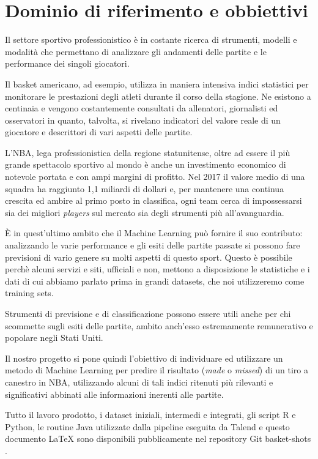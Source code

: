 \section{Dominio di riferimento e obbiettivi}
Il settore sportivo professionistico è in costante ricerca di strumenti, modelli e modalità che permettano di analizzare gli andamenti delle partite e le performance dei singoli giocatori.

Il basket americano, ad esempio, utilizza in maniera intensiva indici statistici per monitorare le prestazioni degli atleti durante il corso della stagione. Ne esistono a centinaia e vengono costantemente consultati da allenatori, giornalisti ed osservatori in quanto, talvolta, si rivelano indicatori del valore reale di un giocatore e descrittori di vari aspetti delle partite.
\par
L'NBA, lega professionistica della regione statunitense, oltre ad essere il più grande spettacolo sportivo al mondo è anche un investimento economico di notevole portata e con ampi margini di profitto. Nel 2017 il valore medio di una squadra ha raggiunto 1,1 miliardi di dollari e, per mantenere una continua crescita ed ambire al primo posto in classifica, ogni team cerca di impossessarsi sia dei migliori \textit{players} sul mercato sia degli strumenti più all'avanguardia.
\par
È in quest'ultimo ambito che il Machine Learning può fornire il suo contributo: analizzando le varie performance e gli esiti delle partite passate si possono fare previsioni di vario genere su molti aspetti di questo sport. 
Questo è possibile perchè alcuni servizi e siti, ufficiali e non, mettono a disposizione le statistiche e i dati di cui abbiamo parlato prima in grandi datasets, che noi utilizzeremo come training sets.
\par
Strumenti di previsione e di classificazione possono essere utili anche per chi scommette sugli esiti delle partite, ambito anch'esso estremamente remunerativo e popolare negli Stati Uniti.
\par
Il nostro progetto si pone quindi l'obiettivo di individuare ed utilizzare un metodo di Machine Learning per predire il risultato (\textit{made} o \textit{missed}) di un tiro a canestro in NBA, utilizzando alcuni di tali indici ritenuti più rilevanti e significativi abbinati alle informazioni inerenti alle partite.
\par
Tutto il lavoro prodotto, i dataset iniziali, intermedi e integrati, gli script R e Python, le routine Java utilizzate dalla pipeline eseguita da Talend e questo documento \LaTeX{} sono disponibili pubblicamente nel repository Git basket-shots \cite{repo}.
